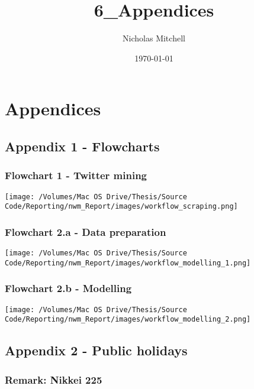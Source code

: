 \documentclass{article}
\author{Nicholas Mitchell}
\date{\today}
\title{6\_Appendices}
\begin{document}
\maketitle
\tableofcontents



\section{Appendices}
\label{sec-1}



\subsection{Appendix 1 - Flowcharts \label{flowcharts}}
\label{sec-1-1}


\subsubsection{Flowchart 1 - Twitter mining \label{flowchart-twitter-mining}}
\label{sec-1-1-1}

\texttt{[image: /Volumes/Mac OS Drive/Thesis/Source Code/Reporting/nwm\_Report/images/workflow\_scraping.png]}


\subsubsection{Flowchart 2.a - Data preparation \label{flowchart-mod}}
\label{sec-1-1-2}

\texttt{[image: /Volumes/Mac OS Drive/Thesis/Source Code/Reporting/nwm\_Report/images/workflow\_modelling\_1.png]}


\subsubsection{Flowchart 2.b - Modelling}
\label{sec-1-1-3}
\texttt{[image: /Volumes/Mac OS Drive/Thesis/Source Code/Reporting/nwm\_Report/images/workflow\_modelling\_2.png]}

\pagebreak

\pagebreak


\subsection{Appendix 2 - Public holidays \label{pub-holidays}}
\label{sec-1-2}


\subsubsection{Remark: Nikkei 225}
\label{sec-1-2-1}
\end{document}

